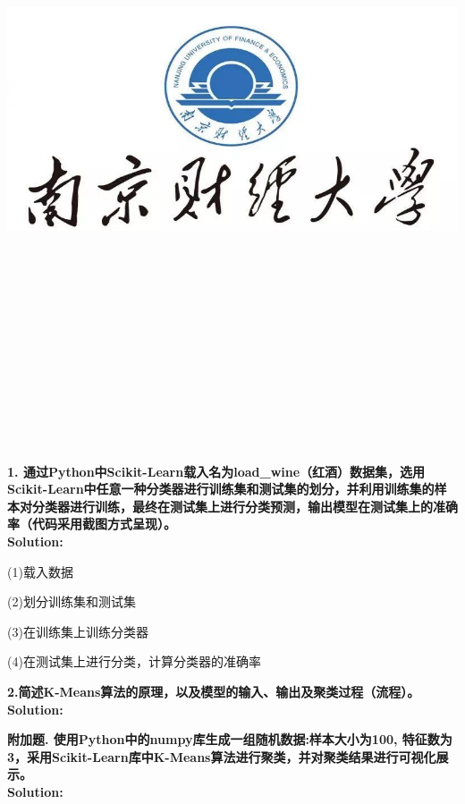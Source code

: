 \documentclass{article}
\title{
	\includegraphics[scale = 0.45]{images/title/ucas-logo1.png}\\
    \vspace{1in}
    \textmd{\textbf{\hmwkClass\ \hmwkTitle}}\\
    \textmd{\textbf{\hmwkSubTitle}}\\
    \normalsize\vspace{0.1in}\small{\hmwkCompleteTime }\\
    \vspace{0.1in}\large{\textit{\hmwkClassInstructor\ }}\\
    \vspace{3in}
}
\author{\hmwkAuthorName \\ 
	\hmwkAuthorStuID}
\date{}
\begin{document}
\maketitle


%


\pagebreak

\begin{homeworkProblem}
\textbf{1.	通过Python中Scikit-Learn\cite{pedregosa2011scikit}载入名为load\_wine（红酒）数据集，选用Scikit-Learn中任意一种分类器进行训练集和测试集的划分，并利用训练集的样本对分类器进行训练，最终在测试集上进行分类预测，输出模型在测试集上的准确率（代码采用截图方式呈现）。}\\
\textbf{Solution:}\\

{\color{blue}(1)载入数据


(2)划分训练集和测试集



(3)在训练集上训练分类器


(4)在测试集上进行分类，计算分类器的准确率  





}
\end{homeworkProblem}

\pagebreak

\begin{homeworkProblem}
	\textbf{2.简述K-Means算法\cite{likas2003global}的原理，以及模型的输入、输出及聚类过程（流程）。}\\
	\textbf{Solution:}\\

\end{homeworkProblem}


\pagebreak

\begin{homeworkProblem}
\textbf{附加题. 使用Python中的numpy库生成一组随机数据:样本大小为100, 特征数为3，采用Scikit-Learn库中K-Means算法进行聚类，并对聚类结果进行可视化展示。}\\
\textbf{Solution:}\\
{\color{blue}


}


\end{homeworkProblem}


\end{document}
